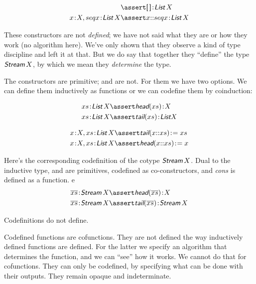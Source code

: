 \documentclass{article}
\begin{document}
\begin{align}
  & \linfer \tj{\listld\,\listrd}{\List\,X} \\
  \tj{x}{X}, \tj{seq{x}}{\List\,X} &\linfer \tj{x\cons{}seq{x}}{\List\,X} \\
\end{align}

These constructors are not \textit{defined}; we have not said what
they are or how they work (no algorithm here). We've only shown that
they observe a kind of type discipline and left it at that. But we do
say that together they ``define'' the type \(\Stream\, X\), by which
we mean they \textit{determine} the type.

The constructors are primitive; \head{} and \tail{} are not. For them
we have two options. We can define them inductively as functions or we
can codefine them by coinduction:

\begin{align}
  \tj{\seq{x}}{\List\,X} & \linfer \tj{\head(\seq{x})}{X} \\
  \tj{\seq{x}}{\List\,X} & \linfer \tj{\tail(\seq{x})}{\List X}
\end{align}

\begin{align}
  \tj{x}{X},\tj{\seq{x}}{\List\,X} & \linfer \tj{\tail(x\cons{}\seq{x})} = \seq{x} \\
  \tj{x}{X},\tj{\seq{x}}{\List\,X} & \linfer \tj{\head(x\cons{}\seq{x})} = x
\end{align}

Here's the corresponding codefinition of the cotype \(\Stream\,X\).
Dual to the inductive type, \head{} and \tail{} are primitives, codefined
as co-constructors, and \textit{cons} is defined as a function.
e
\begin{align}
  \tj{\coseq{x}}{\Stream\,X} & \linfer \tj{\head(\coseq{x})}{X} \\
  \tj{\coseq{x}}{\Stream\,X} & \linfer \tj{\tail(\coseq{x})}{\Stream\,X}
\end{align}



Codefinitions do not define.

Codefined functions are cofunctions. They are not defined the way
inductively defined functions are defined. For the latter we specify
an algorithm that determines the function, and we can ``see'' how it
works. We cannot do that for cofunctions. They can only be codefined,
by specifying what can be done with their outputs. They remain opaque
and indeterminate.
\end{document}
